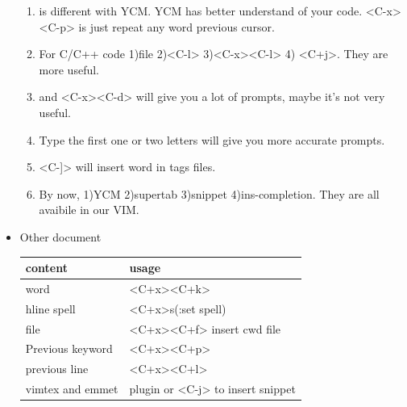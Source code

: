 \documentclass[paper=8.5in:11in, twoside, 12pt, pagesize=pdftex]{book}
\begin{document}
\begin{itemize}
\begin{enumerate}
											
											\item <C-x><C-p> is different with YCM. YCM has better understand of your code. <C-x><C-p> is just repeat any word previous cursor.
											
											\item For C/C++ code 1)file 2)<C-l> 3)<C-x><C-l> 4) <C+j>. They are more useful.
											
											\item <C-x><C-i> and <C-x><C-d> will give you a lot of prompts, maybe it's not very useful.
											
											\item Type the first one or two letters will give you more accurate prompts.
											
											\item <C-x><C-]> will insert word in tags files.
											
											\item By now, 1)YCM 2)supertab 3)snippet 4)ins-completion. They are all avaibile in our VIM. 
										\end{enumerate}
										
										
										\item Other document \\
										
										\begin{tabular}{p{}|p{}}
											\hline 
											content  & usage \\ 
											
											\hline 
											word & <C+x><C+k>\\ 
											
											hline
											spell & <C+x>s(:set spell)\\ 
											
											\hline 
											file & <C+x><C+f> insert cwd file  \\ 
											
											\hline
											Previous keyword & <C+x><C+p> \\
											
											\hline
											previous line & <C+x><C+l> \\
											
											\hline 
											vimtex and emmet & plugin or <C-j> to insert snippet\\
											
											\hline
										\end{tabular}
										
									\end{itemize}
\end{document}
